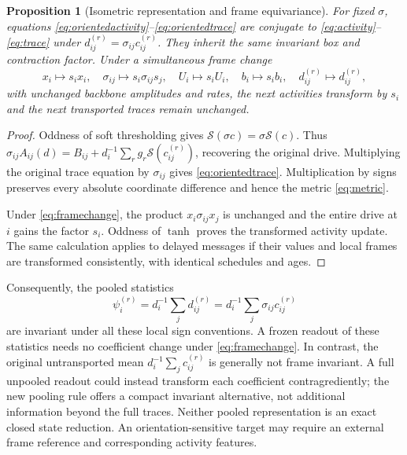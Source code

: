 \documentclass[11pt,a4paper]{article}
\newtheorem{proposition}[theorem]{Proposition}
\theoremstyle{definition}\newtheorem{definition}[theorem]{Definition}
\newcommand{\soft}{\mathcal{S}}
\begin{document}
\begin{proposition}[Isometric representation and frame equivariance]\label{prop:frame}
For fixed $\sigma$, equations \eqref{eq:orientedactivity}--\eqref{eq:orientedtrace} are conjugate to \eqref{eq:activity}--\eqref{eq:trace} under $d^{(r)}_{ij}=\sigma_{ij}c^{(r)}_{ij}$. They inherit the same invariant box and contraction factor. Under a simultaneous frame change
\begin{equation}
 x_i\mapsto s_ix_i,\quad \sigma_{ij}\mapsto s_i\sigma_{ij}s_j,
 \quad U_i\mapsto s_iU_i,\quad b_i\mapsto s_ib_i,
 \quad d^{(r)}_{ij}\mapsto d^{(r)}_{ij},
 \label{eq:framechange}
\end{equation}
with unchanged backbone amplitudes and rates, the next activities transform by $s_i$ and the next transported traces remain unchanged.
\end{proposition}
\begin{proof}
Oddness of soft thresholding gives $\soft(\sigma c)=\sigma\soft(c)$. Thus $\sigma_{ij}A_{ij}(d)=B_{ij}+d_i^{-1}\sum_r g_r\soft(c^{(r)}_{ij})$, recovering the original drive. Multiplying the original trace equation by $\sigma_{ij}$ gives \eqref{eq:orientedtrace}. Multiplication by signs preserves every absolute coordinate difference and hence the metric \eqref{eq:metric}.

Under \eqref{eq:framechange}, the product $x_i\sigma_{ij}x_j$ is unchanged and the entire drive at $i$ gains the factor $s_i$. Oddness of $\tanh$ proves the transformed activity update. The same calculation applies to delayed messages if their values and local frames are transformed consistently, with identical schedules and ages.
\end{proof}

Consequently, the pooled statistics
\begin{equation}
 \psi_i^{(r)}=d_i^{-1}\sum_j d^{(r)}_{ij}
             =d_i^{-1}\sum_j\sigma_{ij}c^{(r)}_{ij}
 \label{eq:invarianttracepool}
\end{equation}
are invariant under all these local sign conventions. A frozen readout of these statistics needs no coefficient change under \eqref{eq:framechange}. In contrast, the original untransported mean $d_i^{-1}\sum_jc^{(r)}_{ij}$ is generally not frame invariant. A full unpooled readout could instead transform each coefficient contragrediently; the new pooling rule offers a compact invariant alternative, not additional information beyond the full traces. Neither pooled representation is an exact closed state reduction. An orientation-sensitive target may require an external frame reference and corresponding activity features.
\end{document}
